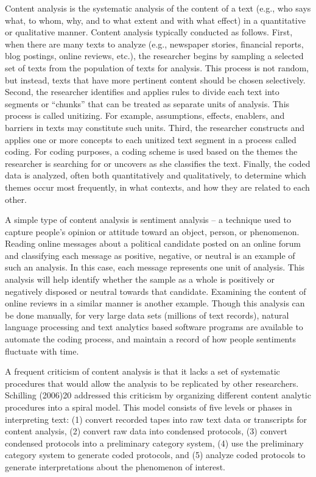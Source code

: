 Content analysis is the systematic analysis of the content of a text (e.g., who says what, to whom, why, and to what extent and with what effect) in a quantitative or qualitative manner. Content analysis typically conducted as follows. First, when there are many texts to analyze (e.g., newspaper stories, financial reports, blog postings, online reviews, etc.), the researcher begins by sampling a selected set of texts from the population of texts for analysis. This process is not random, but instead, texts that have more pertinent content should be chosen selectively. Second, the researcher identifies and applies rules to divide each text into segments or “chunks” that can be treated as separate units of analysis. This process is called unitizing. For example, assumptions, effects, enablers, and barriers in texts may constitute such units. Third, the researcher constructs and applies one or more concepts to each unitized text segment in a process called coding. For coding purposes, a coding scheme is used based on the themes the researcher is searching for or uncovers as she classifies the text. Finally, the coded data is analyzed, often both quantitatively and qualitatively, to determine which themes occur most frequently, in what contexts, and how they are related to each other.

A simple type of content analysis is sentiment analysis – a technique used to capture people’s opinion or attitude toward an object, person, or phenomenon. Reading online messages about a political candidate posted on an online forum and classifying each message as positive, negative, or neutral is an example of such an analysis. In this case, each message represents one unit of analysis. This analysis will help identify whether the sample as a whole is positively or negatively disposed or neutral towards that candidate. Examining the content of online reviews in a similar manner is another example. Though this analysis can be done manually, for very large data sets (millions of text records), natural language processing and text analytics based software programs are available to automate the coding process, and maintain a record of how people sentiments fluctuate with time.

A frequent criticism of content analysis is that it lacks a set of systematic procedures that would allow the analysis to be replicated by other researchers. Schilling (2006)20 addressed this criticism by organizing different content analytic procedures into a spiral model. This model consists of five levels or phases in interpreting text: (1) convert recorded tapes into raw text data or transcripts for content analysis, (2) convert raw data into condensed protocols, (3) convert condensed protocols into a preliminary category system, (4) use the preliminary category system to generate coded protocols, and (5) analyze coded protocols to generate interpretations about the phenomenon of interest.

